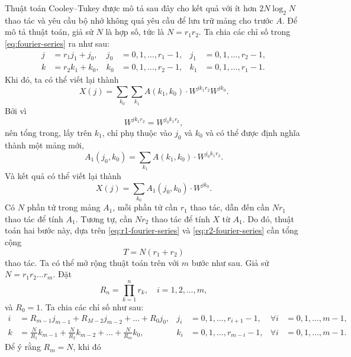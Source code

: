Thuật toán Cooley--Tukey được mô tả sau đây cho kết quả với ít hơn $2N\log_2N$
thao tác và yêu cầu bộ nhớ không quá yêu cầu để lưu trữ mảng cho trước $A$. Để
mô tả thuật toán, giả sử $N$ là hợp số, tức là $N = r_1r_2$. Ta chia các chỉ số
trong \eqref{eq:fourier-series} ra như sau:\begin{equation}\begin{aligned}
  j &= r_1j_1 + j_0, & j_0 &= 0, 1, \dots, r_1 - 1, & j_1 &= 0, 1, \dots, r_2 -
  1, \\
  k &= r_2k_1 + k_0, & k_0 &= 0, 1, \dots, r_2 - 1, & k_1 &= 0, 1, \dots, r_1 -
  1.
\end{aligned}\end{equation} Khi đó, ta có thể viết lại thành \begin{equation}
  X(j) = \sum_{k_0} \sum_{k_1} A(k_1, k_0) \cdot W^{jk_1r_2} W^{jk_0}.
\end{equation} Bởi vì \begin{equation}
  W^{jk_1r_2} = W^{j_0k_1r_2},
\end{equation} nên tổng trong, lấy trên $k_1$, chỉ phụ thuộc vào $j_0$
và $k_0$ và có thể được định nghĩa thành một mảng mới, \begin{equation}
  \label{eq:r1-fourier-series}
  A_1(j_0, k_0) = \sum_{k_1} A(k_1, k_0) \cdot W^{j_0k_1r_2}.
\end{equation} Và kết quả có thể viết lại thành \begin{equation}
  \label{eq:r2-fourier-series}
  X(j) = \sum_{k_0} A_1(j_0, k_0) \cdot W^{jk_0}.
\end{equation} Có $N$ phần tử trong mảng $A_1$, mỗi phần tử cần $r_1$ thao tác,
dẫn đến cần $Nr_1$ thao tác để tính $A_1$. Tương tự, cần $Nr_2$ thao tác để
tính $X$ từ $A_1$. Do đó, thuật toán hai bước này, dựa trên
\eqref{eq:r1-fourier-series} và \eqref{eq:r2-fourier-series} cần tổng cộng
\begin{equation}
  T = N(r_1 + r_2)
\end{equation} thao tác. Ta có thể mở rộng thuật toán trên với $m$ bước như
sau. Giả sử $N = r_1r_2 \dots r_m$. Đặt \begin{equation}
  R_n = \prod_{k = 1}^n r_k, \quad i = 1, 2, \dots, m,
\end{equation} và $R_0 = 1$. Ta chia các chỉ số như sau:
\begin{equation}\begin{aligned}
  i &= R_{m - 1}j_{m - 1} + R_{M - 2}j_{m - 2} + \dots + R_0j_0, & j_i &= 0, 1,
  \dots, r_{i + 1} - 1, & \forall i &= 0, 1, \dots, m - 1, \\
  k &= \frac{N}{R_1}k_{m - 1} + \frac{N}{R_2}k_{m - 2} + \dots +
  \frac{N}{R_m}k_0, & k_i &= 0, 1, \dots, r_{m - i} - 1, & \forall i &=
  0, 1, \dots, m - 1.
\end{aligned}\end{equation} Để ý rằng $R_m = N$, khi đó
